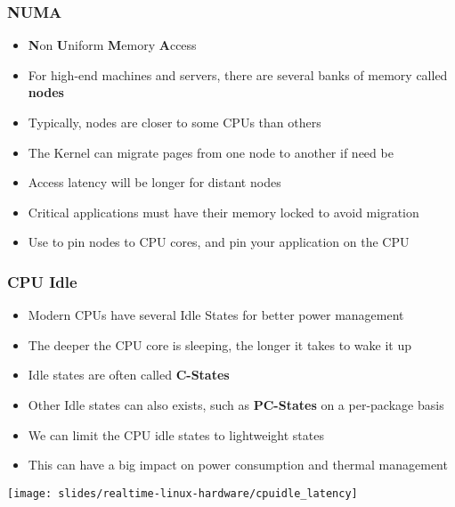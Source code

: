 \begin{frame}
	\frametitle{NUMA}
	\begin{itemize}
		\item \textbf{N}on \textbf{U}niform \textbf{M}emory \textbf{A}ccess
		\item For high-end machines and servers, there are several banks of memory called \textbf{nodes}
		\item Typically, nodes are closer to some CPUs than others 
		\item The Kernel can migrate pages from one node to another if need be
		\item Access latency will be longer for distant nodes
		\item Critical applications must have their memory locked to avoid migration
		\item Use  to pin nodes to CPU cores, and pin your application on the CPU
	\end{itemize}
\end{frame}

\begin{frame}
	\frametitle{CPU Idle}
	\begin{itemize}
		\item Modern CPUs have several Idle States for better power management
		\item The deeper the CPU core is sleeping, the longer it takes to wake it up
		\item Idle states are often called \textbf{C-States}
		\item Other Idle states can also exists, such as \textbf{PC-States} on a per-package basis
		\item We can limit the CPU idle states to lightweight states
		\item This can have a big impact on power consumption and thermal management
	\end{itemize}
	\texttt{[image: slides/realtime-linux-hardware/cpuidle\_latency]}
\end{frame}

